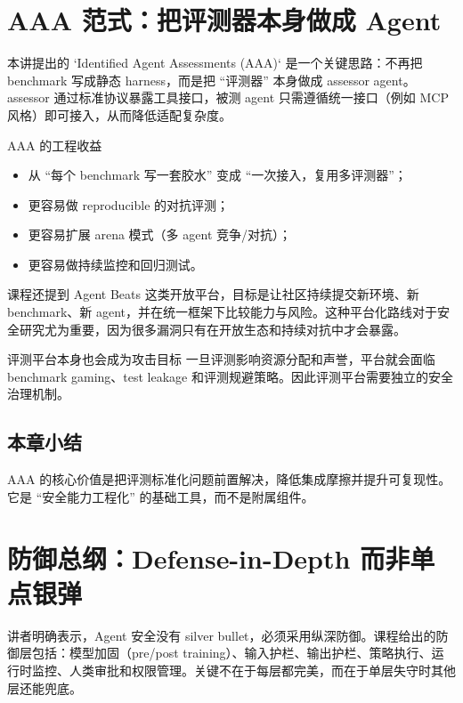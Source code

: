 \documentclass[a4paper]{article}
\begin{document}
\section{AAA 范式：把评测器本身做成 Agent}

本讲提出的 `Identified Agent Assessments (AAA)` 是一个关键思路：不再把 benchmark 写成静态 harness，而是把 ``评测器'' 本身做成 assessor agent。assessor 通过标准协议暴露工具接口，被测 agent 只需遵循统一接口（例如 MCP 风格）即可接入，从而降低适配复杂度。

\begin{importantbox}{AAA 的工程收益}
\begin{itemize}
    \item 从 ``每个 benchmark 写一套胶水'' 变成 ``一次接入，复用多评测器''；
    \item 更容易做 reproducible 的对抗评测；
    \item 更容易扩展 arena 模式（多 agent 竞争/对抗）；
    \item 更容易做持续监控和回归测试。
\end{itemize}
\end{importantbox}

课程还提到 Agent Beats 这类开放平台，目标是让社区持续提交新环境、新 benchmark、新 agent，并在统一框架下比较能力与风险。这种平台化路线对于安全研究尤为重要，因为很多漏洞只有在开放生态和持续对抗中才会暴露。

\begin{warningbox}{评测平台本身也会成为攻击目标}
一旦评测影响资源分配和声誉，平台就会面临 benchmark gaming、test leakage 和评测规避策略。因此评测平台需要独立的安全治理机制。
\end{warningbox}

\subsection{本章小结}
AAA 的核心价值是把评测标准化问题前置解决，降低集成摩擦并提升可复现性。它是 ``安全能力工程化'' 的基础工具，而不是附属组件。

\section{防御总纲：Defense-in-Depth 而非单点银弹}

讲者明确表示，Agent 安全没有 silver bullet，必须采用纵深防御。课程给出的防御层包括：模型加固（pre/post training）、输入护栏、输出护栏、策略执行、运行时监控、人类审批和权限管理。关键不在于每层都完美，而在于单层失守时其他层还能兜底。
\end{document}
